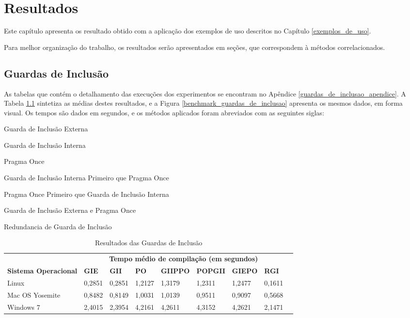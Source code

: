 \chapter[Resultados]{Resultados}

Este capítulo apresenta os resultado obtido com a aplicação dos exemplos
 de uso descritos no Capítulo \ref{exemplos_de_uso}.

Para melhor organização do trabalho, os resultados serão apresentados em seções,
 que correspondem à métodos correlacionados.

\section{Guardas de Inclusão}

As tabelas que contém o detalhamento das execuções dos experimentos se encontram
 no Apêndice \ref{guardas_de_inclusao_apendice}.
 A Tabela \ref{tab:resutados_guards_de_inclusao}
sintetiza as médias destes resultados, e a Figura \ref{benchmark_guardas_de_inclusao} apresenta os mesmos dados, em forma
visual. Os tempos são dados em segundos, e os métodos aplicados foram abreviados com as seguintes siglas:

\begin{description}
    \tiny
    \item [GIE:] Guarda de Inclusão Externa
    \item [GII:] Guarda de Inclusão Interna
    \item [PO:]  Pragma Once
    \item [GIIPPO:] Guarda de Inclusão Interna Primeiro que Pragma Once
    \item [POPGII:] Pragma Once Primeiro que Guarda de Inclusão Interna
    \item [GIEPPO:] Guarda de Inclusão Externa e Pragma Once
    \item [RGI:] Redundancia de Guarda de Inclusão
\end{description}

\begin{table}[!ht]
\centering
\caption{Resultados das Guardas de Inclusão}
\label{tab:resutados_guards_de_inclusao}
\begin{tiny}
\begin{tabular}{lp{1cm}p{1cm}p{1cm}p{1cm}p{1cm}p{1cm}p{1cm}p{1cm}}
& \multicolumn{7}{c}{\textbf{Tempo médio de compilação (em segundos)} } \\
\textbf{Sistema Operacional} & \textbf{GIE} & \textbf{GII} & \textbf{PO} &
\textbf{GIIPPO} & \textbf{POPGII} & \textbf{GIEPO} & \textbf{RGI} \\ \toprule
 Linux & 0,2851     & 0,2851  & 1,2127    & 1,3179    & 1,2311  & 1,2477     & 0,1611 \\
 Mac OS Yosemite & 0,8482 & 0,8149 & 1,0031  & 1,0139  & 0,9511  & 0,9097  & 0,5668  \\ 
 Windows 7 & 2,4015 & 2,3954 & 4,2161 & 4,2611 & 4,3152 & 4,2621  & 2,1471 \\
\bottomrule
\end{tabular}
\end{tiny}
\end{table}


